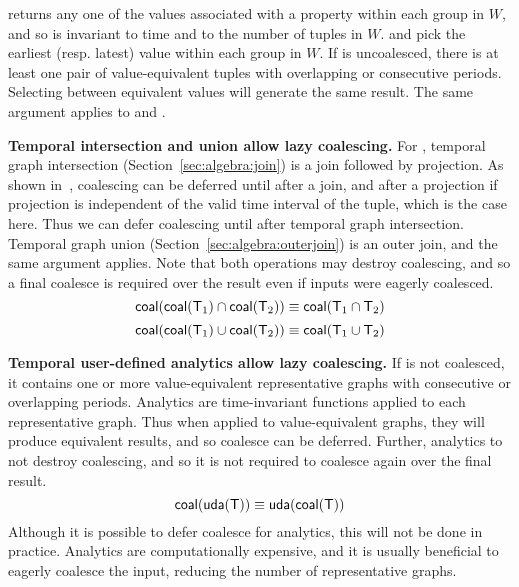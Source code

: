  returns any one of the values associated with a property
within each group in $W$, and so is invariant to time and to the
number of tuples in $W$.   and  pick the
earliest (resp. latest) value within each group in $W$.  If \ttt is
uncoalesced, there is at least one pair of value-equivalent tuples
with overlapping or consecutive periods.  Selecting between equivalent
values will generate the same result.  The same argument applies to
 and .

{\bf Temporal intersection and union allow lazy coalescing.} For \trg,
temporal graph intersection (Section~\ref{sec:algebra:join}) is a join
followed by projection.  As shown in~\cite{DBLP:conf/vldb/BohlenSS96},
coalescing can be deferred until after a join, and after a projection
if projection is independent of the valid time interval of the tuple,
which is the case here.  Thus we can defer coalescing until after
temporal graph intersection.  Temporal graph union
(Section~\ref{sec:algebra:outerjoin}) is an outer join, and the same
argument applies.  Note that both operations may destroy coalescing,
and so a final coalesce is required over the result even if inputs
were eagerly coalesced.
\begin{equation}
\textsf{coal}(\textsf{coal}(\mathsf{T}_1) \cap \textsf{coal}(\mathsf{T}_2)) \equiv \textsf{coal}(\mathsf{T}_1 \cap \mathsf{T}_2)
\label{rul:intersect}
\end{equation}
\begin{equation}
\textsf{coal}(\textsf{coal}(\mathsf{T}_1) \cup \textsf{coal}(\mathsf{T}_2)) \equiv \textsf{coal}(\mathsf{T}_1 \cup \mathsf{T}_2)
\label{rul:union}
\end{equation}

{\bf Temporal user-defined analytics allow lazy coalescing.} If \trg
is not coalesced, it contains one or more value-equivalent
representative graphs with consecutive or overlapping periods.
Analytics are time-invariant functions applied to each representative
graph.  Thus when applied to value-equivalent graphs, they will
produce equivalent results, and so coalesce can be deferred.  Further,
analytics to not destroy coalescing, and so it is not required to
coalesce again over the final result.  
\begin{equation}
\textsf{coal}(\textsf{uda}(\mathsf{T})) \equiv \textsf{uda}(\textsf{coal}(\mathsf{T}))
\label{rul:analytic}
\end{equation}
Although it is possible to defer coalesce for analytics, this will not
be done in practice.  Analytics are computationally expensive, and it
is usually beneficial to eagerly coalesce the input, reducing the
number of representative graphs.




